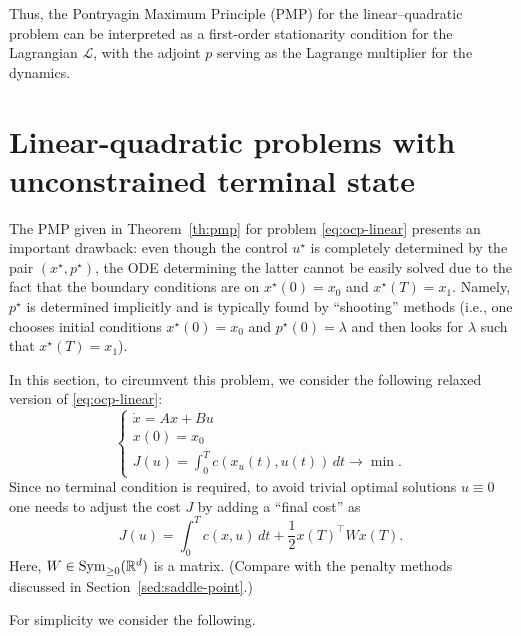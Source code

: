 Thus, the Pontryagin Maximum Principle (PMP) for the linear–quadratic problem can be interpreted as a first-order stationarity condition for the Lagrangian $\mathcal{L}$, with the adjoint $p$ serving as the Lagrange multiplier for the dynamics.

\section{Linear-quadratic problems with unconstrained terminal state}

The PMP given in Theorem~\ref{th:pmp} for problem \eqref{eq:ocp-linear} presents an important drawback: even though the control $u^\star$ is completely determined by the pair $(x^\star,p^\star)$, the ODE determining the latter cannot be easily solved due to the fact that the boundary conditions are on $x^\star(0)=x_0$ and $x^\star (T)=x_1$. 
Namely, $p^\star$ is determined implicitly and is typically found by ``shooting'' methods (i.e., one chooses initial conditions $x^\star(0)=x_0$ and $p^\star(0)=\lambda$ and then looks for $\lambda$ such that $x^\star(T)=x_1$).

In this section, to circumvent this problem, we consider the following relaxed version of \eqref{eq:ocp-linear}:
\begin{equation}
   \label{eq:ocp-linear-no-terminal}
   \begin{cases}
    \dot x = A x + Bu \\
    x(0)=x_0 \\
    J(u) = \int_0^T c(x_u(t),u(t))\, dt \rightarrow \min.
   \end{cases} 
\end{equation}
Since no terminal condition is required, to avoid trivial optimal solutions $u\equiv 0$ one needs to adjust the cost $J$ by adding a ``final cost'' as
\begin{equation}
    \label{eq:J-no-terminal}
    J(u) = \int_0^T c(x,u)\, dt + \frac12 x(T)^\top W x(T).
\end{equation}
Here, $W\in \operatorname{Sym}_{\ge 0}(\mathbb{R}^d)$ is a matrix. 
(Compare with the penalty methods discussed in Section~\ref{sed:saddle-point}.)

For simplicity we consider the following.


